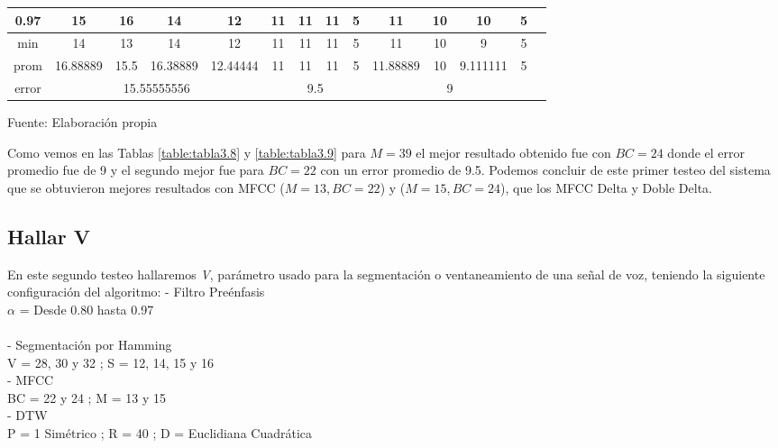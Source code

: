 \begin{center}
\begin{table}[H]
{\begin{tabular}{|c|c|c|c|c|c|c|c|c|c|c|c|c|c|}
\hline 
0.97 & 
15 & 16 & 14 & 12 & 11 & 11 & 11 & 5 & 11 & 10 & 10 & 5 \\
\hline 
min & 
14 & 13 & 14 & 12 & 11 & 11 & 11 & 5 & 11 & 10 & 9 & 5 \\
\hline 
prom & 
16.88889 & 15.5 & 16.38889 & 12.44444 & 11 & 11 & 11 & 5 & 11.88889 & 10 & 9.111111 & 5 \\
\hline 
error & 
\multicolumn{4}{c|}{15.55555556} & 
\multicolumn{4}{c|}{9.5} & 
\multicolumn{4}{c|}{9}\\ 
\hline 
\end{tabular} 
}
\begin{center}
\vskip 0.2cm
{\small{Fuente: Elaboración propia}}
\end{center}
\end{table}
\end{center}

\vskip -0.5cm
Como vemos en las Tablas \ref{table:tabla3.8} y \ref{table:tabla3.9} para $M = 39$ el mejor resultado obtenido fue con $BC = 24$ donde el error promedio fue de 9 y el segundo mejor fue para $BC = 22$ con un error promedio de 9.5. Podemos concluir de este primer testeo del sistema que se obtuvieron mejores resultados con MFCC ($M = 13, BC = 22$) y ($M = 15, BC = 24$), que los MFCC Delta y Doble Delta.

\subsection{Hallar V}
En este segundo testeo hallaremos \textit{V}, parámetro usado para la segmentación o ventaneamiento de una señal de voz, teniendo la siguiente configuración del algoritmo:
\newpage
- Filtro Preénfasis \\
\hspace*{1cm} $\alpha$ = Desde 0.80 hasta 0.97 \\ \\
- Segmentación por Hamming \\
\hspace*{1cm} V = 28, 30 y 32 ; \qquad S = 12, 14, 15 y 16 \\
- MFCC \\
\hspace*{1cm} BC = 22 y 24 ; \qquad M = 13 y 15 \\
- DTW \\
\hspace*{1cm} P = 1 Simétrico ; \qquad R = 40 ; \qquad D = Euclidiana Cuadrática

